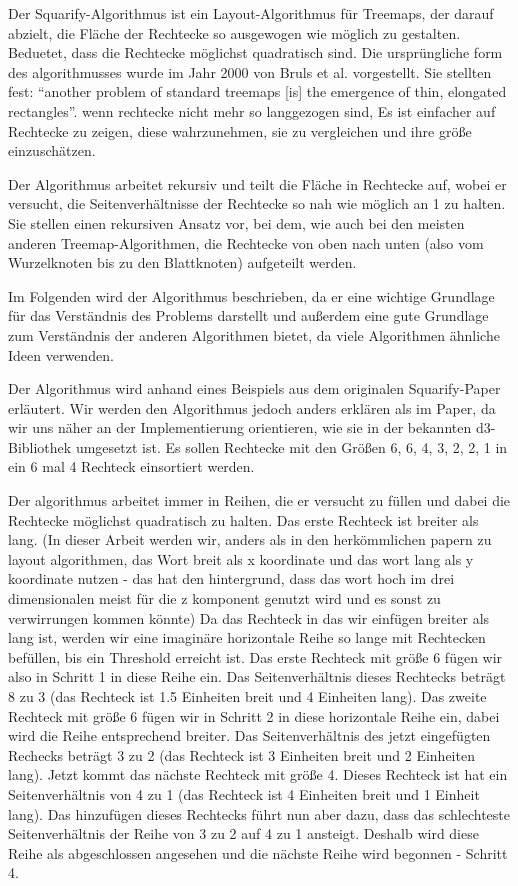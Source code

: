 Der Squarify-Algorithmus ist ein Layout-Algorithmus für Treemaps, der darauf abzielt, die Fläche der Rechtecke so ausgewogen wie möglich zu gestalten. Beduetet, dass die Rechtecke möglichst quadratisch sind. Die ursprüngliche form des algorithmusses wurde im Jahr 2000 von Bruls et al. \cite{bruls2000squarified} vorgestellt. Sie stellten fest: \enquote{another problem of standard treemaps [is] the emergence of thin, elongated rectangles}\cite[1]{bruls2000squarified}. wenn rechtecke nicht mehr so langgezogen sind, Es ist einfacher auf Rechtecke zu zeigen, diese wahrzunehmen, sie zu vergleichen und ihre größe einzuschätzen. 

Der Algorithmus arbeitet rekursiv und teilt die Fläche in Rechtecke auf, wobei er versucht, die Seitenverhältnisse der Rechtecke so nah wie möglich an 1 zu halten. Sie stellen einen rekursiven Ansatz vor, bei dem, wie auch bei den meisten anderen Treemap-Algorithmen, die Rechtecke von oben nach unten (also vom Wurzelknoten bis zu den Blattknoten) aufgeteilt werden.

Im Folgenden wird der Algorithmus beschrieben, da er eine wichtige Grundlage für das Verständnis des Problems darstellt und außerdem eine gute Grundlage zum Verständnis der anderen Algorithmen bietet, da viele Algorithmen ähnliche Ideen verwenden.

Der Algorithmus wird anhand eines Beispiels aus dem originalen Squarify-Paper \cite[5]{bruls2000squarified} erläutert. Wir werden den Algorithmus jedoch anders erklären als im Paper, da wir uns näher an der Implementierung orientieren, wie sie in der bekannten d3-Bibliothek \cite{d3_treemap_code} umgesetzt ist.
Es sollen Rechtecke mit den Größen 6, 6, 4, 3, 2, 2, 1 in ein 6 mal 4 Rechteck einsortiert werden.

Der algorithmus arbeitet immer in Reihen, die er versucht zu füllen und dabei die Rechtecke möglichst quadratisch zu halten. Das erste Rechteck ist breiter als lang. (In dieser Arbeit werden wir, anders als in den herkömmlichen papern zu layout algorithmen, das Wort breit als x koordinate und das wort lang als y koordinate nutzen - das hat den hintergrund, dass das wort hoch im drei dimensionalen meist für die z komponent genutzt wird und es sonst zu verwirrungen kommen könnte)
Da das Rechteck in das wir einfügen breiter als lang ist, werden wir eine imaginäre horizontale Reihe so lange mit Rechtecken befüllen, bis ein Threshold erreicht ist. Das erste Rechteck mit größe 6 fügen wir also in Schritt 1 in diese Reihe ein. Das Seitenverhältnis dieses Rechtecks beträgt 8 zu 3 (das Rechteck ist 1.5 Einheiten breit und 4 Einheiten lang). Das zweite Rechteck mit größe 6 fügen wir in Schritt 2 in diese horizontale Reihe ein, dabei wird die Reihe entsprechend breiter. Das Seitenverhältnis des jetzt eingefügten Rechecks beträgt 3 zu 2 (das Rechteck ist 3 Einheiten breit und 2 Einheiten lang). Jetzt kommt das nächste Rechteck mit größe 4. Dieses Rechteck ist hat ein Seitenverhältnis von 4 zu 1 (das Rechteck ist 4 Einheiten breit und 1 Einheit lang). Das hinzufügen dieses Rechtecks führt nun aber dazu, dass das schlechteste Seitenverhältnis der Reihe von 3 zu 2 auf 4 zu 1 ansteigt. Deshalb wird diese Reihe als abgeschlossen angesehen und die nächste Reihe wird begonnen - Schritt 4. 

